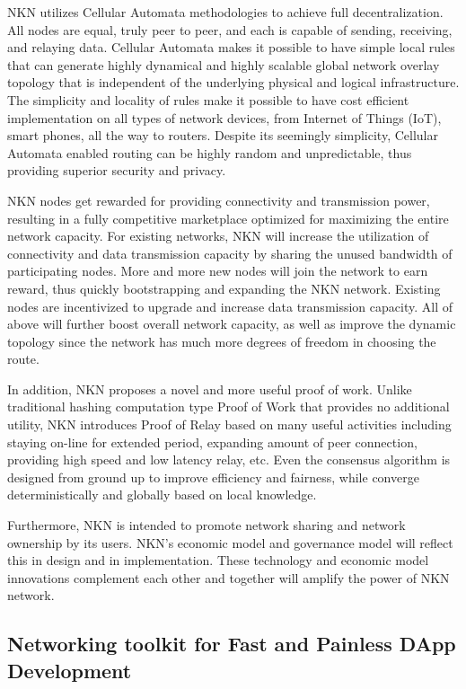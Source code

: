 \documentclass[reprint,pre,aps]{revtex4-1}
\begin{document}
NKN utilizes Cellular Automata methodologies to achieve full decentralization. All nodes are equal, truly peer to peer, and each is capable of sending, receiving, and relaying data. Cellular Automata makes it possible to have simple local rules that can generate highly dynamical and highly scalable global network overlay topology that is independent of the underlying physical and logical infrastructure. The simplicity and locality of rules make it possible to have cost efficient implementation on all types of network devices, from Internet of Things (IoT), smart phones, all the way to routers. Despite its seemingly simplicity, Cellular Automata enabled routing can be highly random and unpredictable, thus providing superior security and privacy.

NKN nodes get rewarded for providing connectivity and transmission power, resulting in a fully competitive marketplace optimized for maximizing the entire network capacity. For existing networks, NKN will increase the utilization of connectivity and data transmission capacity by sharing the unused bandwidth of participating nodes. More and more new nodes will join the network to earn reward, thus quickly bootstrapping and expanding the NKN network. Existing nodes are incentivized to upgrade and increase data transmission capacity. All of above will further boost overall network capacity, as well as improve the dynamic topology since the network has much more degrees of freedom in choosing the route. 

In addition, NKN proposes a novel and more useful proof of work. Unlike traditional hashing computation type Proof of Work that provides no additional utility, NKN introduces Proof of Relay based on many useful activities including staying on-line for extended period, expanding amount of peer connection, providing high speed and low latency relay, etc. Even the consensus algorithm is designed from ground up to improve efficiency and fairness, while converge deterministically and globally based on local knowledge.

Furthermore, NKN is intended to promote network sharing and network ownership by its users. NKN's economic model and governance model will reflect this in design and in implementation. These technology and economic model innovations complement each other and together will amplify the power of NKN network.

\subsection{Networking toolkit for Fast and Painless DApp Development}
\end{document}
